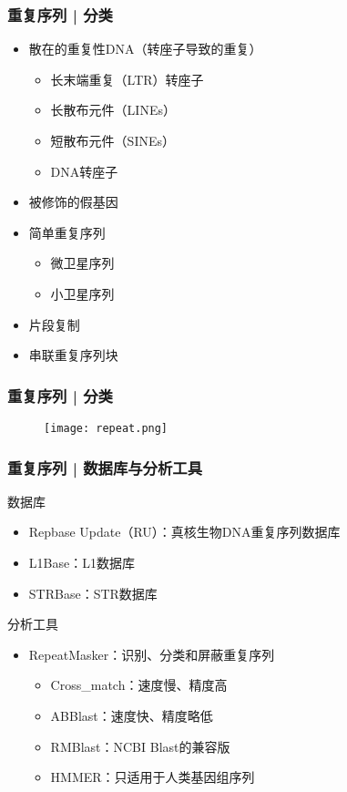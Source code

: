 \begin{frame}
  \frametitle{重复序列 | 分类}
  \begin{itemize}
    \item 散在的重复性DNA（转座子导致的重复）
      \begin{itemize}
	\item 长末端重复（LTR）转座子
	\item 长散布元件（LINEs）
	\item 短散布元件（SINEs）
	\item DNA转座子
      \end{itemize}
    \item 被修饰的假基因
    \item 简单重复序列
      \begin{itemize}
	\item 微卫星序列
	\item 小卫星序列
      \end{itemize}
    \item 片段复制
    \item 串联重复序列块
  \end{itemize}
\end{frame}

\begin{frame}
  \frametitle{重复序列 | 分类}
  \begin{figure}
    \centering
    \texttt{[image: repeat.png]}
  \end{figure}
\end{frame}

\begin{frame}
  \frametitle{重复序列 | 数据库与分析工具}
  \begin{block}{数据库}
  \begin{itemize}
    \item Repbase Update（RU）：真核生物DNA重复序列数据库
    \item L1Base：L1数据库
    \item STRBase：STR数据库
  \end{itemize}
  \end{block}
  \pause
  \begin{block}{\alert{分析工具}}
  \begin{itemize}
    \item RepeatMasker：识别、分类和屏蔽重复序列
      \begin{itemize}
        \item Cross\_match：速度慢、精度高
        \item ABBlast：速度快、精度略低
        \item RMBlast：NCBI Blast的兼容版
        \item HMMER：只适用于人类基因组序列
      \end{itemize}
  \end{itemize}
  \end{block}
\end{frame}

